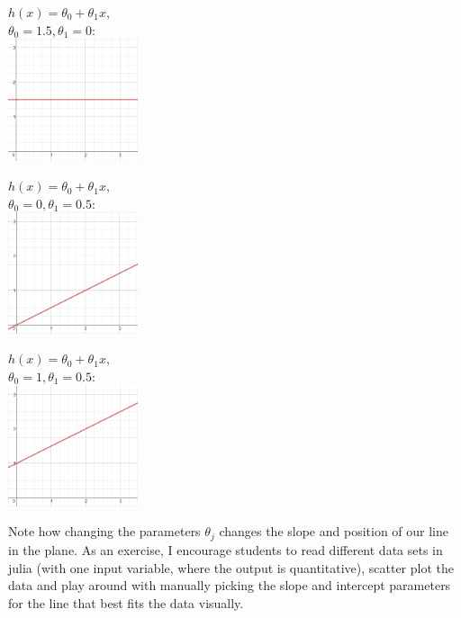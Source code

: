 \documentclass[11pt,a4paper,oneside]{report}
\begin{document}
\begin{minipage}{2in}
{\small $h(x) = \theta_0 + \theta_1 x$, \\
$\theta_0 = 1.5, \theta_1 = 0$:\\}
\includegraphics[width=1.5in]{plot1.png}
\end{minipage}
\begin{minipage}{2in}
{\small $h(x) = \theta_0 + \theta_1 x$, \\
$\theta_0 = 0, \theta_1 = 0.5$:\\}
\includegraphics[width=1.5in]{plot2.png}
\end{minipage}
\begin{minipage}{2in}
{\small $h(x) = \theta_0 + \theta_1 x$, \\
$\theta_0 = 1, \theta_1 = 0.5$:\\}
\includegraphics[width=1.5in]{plot3.png}\\
\end{minipage}

Note how changing the parameters $\theta_j$ changes the slope and position of our line in the plane. As an exercise, I encourage students to read different data sets in julia (with one input variable, where the output is quantitative), scatter plot the data and play around with manually picking the slope and intercept parameters for the line that best fits the data visually.\\
\end{document}
